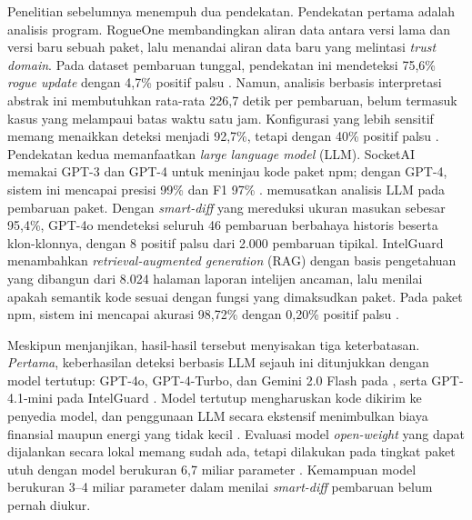 \documentclass[a4paper,fleqn]{cas-dc}
\begin{document}
Penelitian sebelumnya menempuh dua pendekatan. Pendekatan pertama adalah analisis
program. RogueOne membandingkan aliran data antara versi lama dan versi baru
sebuah paket, lalu menandai aliran data baru yang melintasi \emph{trust domain}.
Pada dataset pembaruan tunggal, pendekatan ini mendeteksi 75,6\% \emph{rogue
update} dengan 4,7\% positif palsu \citep{sofaer2024rogueone}. Namun, analisis
berbasis interpretasi abstrak ini membutuhkan rata-rata 226,7 detik per
pembaruan, belum termasuk kasus yang melampaui batas waktu satu jam. Konfigurasi
yang lebih sensitif memang menaikkan deteksi menjadi 92,7\%, tetapi dengan 40\%
positif palsu \citep{sofaer2024rogueone}. Pendekatan kedua memanfaatkan
\emph{large language model} (LLM). SocketAI memakai GPT-3 dan GPT-4 untuk
meninjau kode paket npm; dengan GPT-4, sistem ini mencapai presisi 99\% dan F1
97\% \citep{zahan2025leveraging}. \citet{wyss2025evaluating} memusatkan analisis
LLM pada pembaruan paket. Dengan \emph{smart-diff} yang mereduksi ukuran masukan
sebesar 95,4\%, GPT-4o mendeteksi seluruh 46 pembaruan berbahaya historis
beserta klon-klonnya, dengan 8 positif palsu dari 2.000 pembaruan tipikal.
IntelGuard menambahkan \emph{retrieval-augmented generation} (RAG) dengan basis
pengetahuan yang dibangun dari 8.024 halaman laporan intelijen ancaman, lalu
menilai apakah semantik kode sesuai dengan fungsi yang dimaksudkan paket. Pada
paket npm, sistem ini mencapai akurasi 98,72\% dengan 0,20\% positif palsu
\citep{guo2026bridging}.

Meskipun menjanjikan, hasil-hasil tersebut menyisakan tiga keterbatasan.
\emph{Pertama}, keberhasilan deteksi berbasis LLM sejauh ini ditunjukkan dengan
model tertutup: GPT-4o, GPT-4-Turbo, dan Gemini 2.0 Flash pada
\citet{wyss2025evaluating}, serta GPT-4.1-mini pada IntelGuard
\citep{guo2026bridging}. Model tertutup mengharuskan kode dikirim ke penyedia
model, dan penggunaan LLM secara ekstensif menimbulkan biaya finansial maupun
energi yang tidak kecil \citep{wyss2025evaluating}. Evaluasi model
\emph{open-weight} yang dapat dijalankan secara lokal memang sudah ada, tetapi
dilakukan pada tingkat paket utuh dengan model berukuran 6,7 miliar parameter
\citep{nguyen2025taint}. Kemampuan model berukuran 3--4 miliar parameter dalam
menilai \emph{smart-diff} pembaruan belum pernah diukur.
\end{document}
